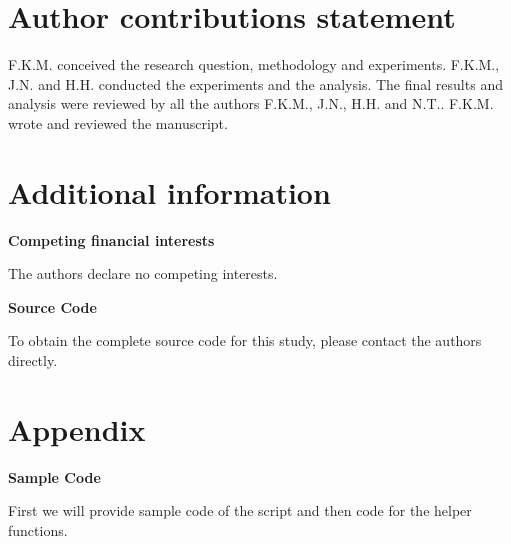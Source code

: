 \documentclass[fleqn,10pt]{wlscirep}\usepackage[]{graphicx}\usepackage[]{color}
\begin{document}


\section*{Author contributions statement}

F.K.M. conceived the research question, methodology and experiments. F.K.M., J.N. and H.H. conducted the experiments and the analysis. The final results and analysis were reviewed by all the authors F.K.M., J.N., H.H. and N.T.. F.K.M. wrote and reviewed the manuscript. 

\section*{Additional information}

\textbf{Competing financial interests} 

The authors declare no competing interests.


\textbf{Source Code}

To obtain the complete source code for this study, please contact the authors directly. 

\section*{Appendix}

\textbf{Sample Code}

First we will provide sample code of the script and then code for the helper functions.
\end{document}
